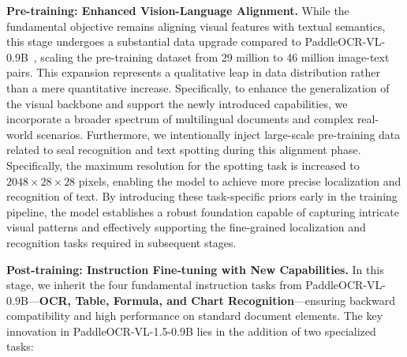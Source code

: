\documentclass[11pt, a4paper,logo,  copyright, nonumbering]{paddleocr}
\begin{document}
\textbf{Pre-training: Enhanced Vision-Language Alignment.} 
While the fundamental objective remains aligning visual features with textual semantics, this stage undergoes a substantial data upgrade compared to PaddleOCR-VL-0.9B~\cite{cui2025paddleocrvl}, scaling the pre-training dataset from 29 million to 46 million image-text pairs. This expansion represents a qualitative leap in data distribution rather than a mere quantitative increase. Specifically, to enhance the generalization of the visual backbone and support the newly introduced capabilities, we incorporate a broader spectrum of multilingual documents and complex real-world scenarios. Furthermore, we intentionally inject large-scale pre-training data related to seal recognition and text spotting during this alignment phase. Specifically, the maximum resolution for the spotting task is increased to $2048 \times 28 \times 28$ pixels, enabling the model to achieve more precise localization and recognition of text. By introducing these task-specific priors early in the training pipeline, the model establishes a robust foundation capable of capturing intricate visual patterns and effectively supporting the fine-grained localization and recognition tasks required in subsequent stages.

\textbf{Post-training: Instruction Fine-tuning with New Capabilities.} 
In this stage, we inherit the four fundamental instruction tasks from PaddleOCR-VL-0.9B—\textbf{OCR, Table, Formula, and Chart Recognition}—ensuring backward compatibility and high performance on standard document elements. The key innovation in PaddleOCR-VL-1.5-0.9B lies in the addition of two specialized tasks:
\end{document}
